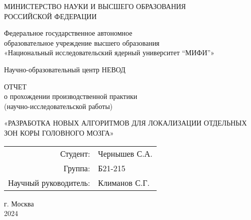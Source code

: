 \thispagestyle{empty}

\begin{center}
    МИНИСТЕРСТВО НАУКИ И ВЫСШЕГО ОБРАЗОВАНИЯ \\ РОССИЙСКОЙ ФЕДЕРАЦИИ

    \vspace{20pt}

    Федеральное государственное автономное \\ образовательное учреждение высшего образования \\
    «Национальный исследовательский ядерный университет “МИФИ”» 

    \vspace{20pt}

    {Научно-образовательный центр НЕВОД}
\end{center}

\vfill

\begin{center}
    ОТЧЕТ \\  
     о прохождении производственной практики \\ (научно-исследовательской работы)

    \vspace{20pt}

    \uppercase{«Разработка новых алгоритмов для локализации отдельных зон коры головного мозга»}
\end{center}

\vfill
\hfill
\begin{flushright}
    \begin{tabular}{rl}
        Студент: & Чернышев С.А. \\[0.5cm]
        Группа: & Б21-215 \\[0.5cm]
        Научный руководитель: & Климанов С.Г. \\
    \end{tabular}
\end{flushright}
\vfill

\begin{center}
    г. Москва\\
 2024
\end{center}